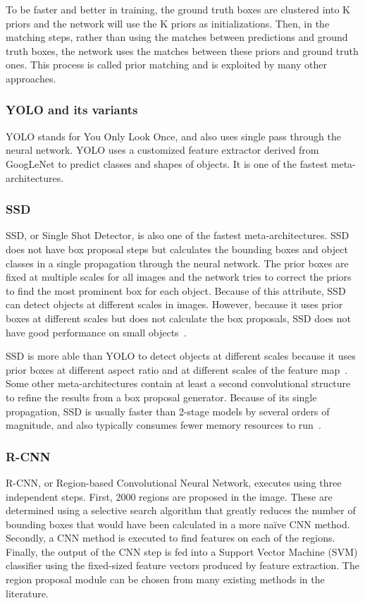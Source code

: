 \documentclass[conference]{IEEEtran}
\begin{document}
To be faster and better in training, the ground truth boxes are clustered into K priors and the network will use the K priors as initializations. Then, in the matching steps, rather than using the matches between predictions and ground truth boxes, the network uses the matches between these priors and ground truth ones. This process is called prior matching and is exploited by many other approaches.

\subsubsection{YOLO and its variants}
YOLO stands for You Only Look Once, and also uses single pass through the neural network.  YOLO uses a customized feature extractor derived from GoogLeNet to predict classes and shapes of objects.  It is one of the fastest meta-architectures.

\subsubsection{SSD}
SSD, or Single Shot Detector, is also one of the fastest meta-architectures.
SSD does not have box proposal steps but calculates the bounding boxes and object classes in a single propagation through the neural network.
The prior boxes are fixed at multiple scales for all images and the network tries to correct the priors to find the most prominent box for each object.
Because of this attribute, SSD can detect objects at different scales in images.
However, because it uses prior boxes at different scales but does not calculate the box proposals, SSD does not have good performance on small objects~\cite{liu2016ssd}.

SSD is more able than YOLO to detect objects at different scales because it uses prior boxes at different aspect ratio and at different scales of the feature map~\cite{liu2016ssd}. 
Some other meta-architectures contain at least a second convolutional structure to refine the results from a box proposal generator. 
Because of its single propagation, SSD is usually faster than 2-stage models by several orders of magnitude, and also typically consumes fewer memory resources to run~\cite{huang2017speed}.

\subsubsection{R-CNN}
R-CNN, or Region-based Convolutional Neural Network, executes using three independent steps.  First, 2000 regions are proposed in the image.  These are determined using a selective search algorithm that greatly reduces the number of bounding boxes that would have been calculated in a more na\"{i}ve CNN method.  Secondly, a CNN method is executed to find features on each of the regions.  Finally, the output of the CNN step is fed into a Support Vector Machine (SVM) classifier using the fixed-sized feature vectors produced by feature extraction.
The region proposal module can be chosen from many existing methods in the literature.   
\end{document}
